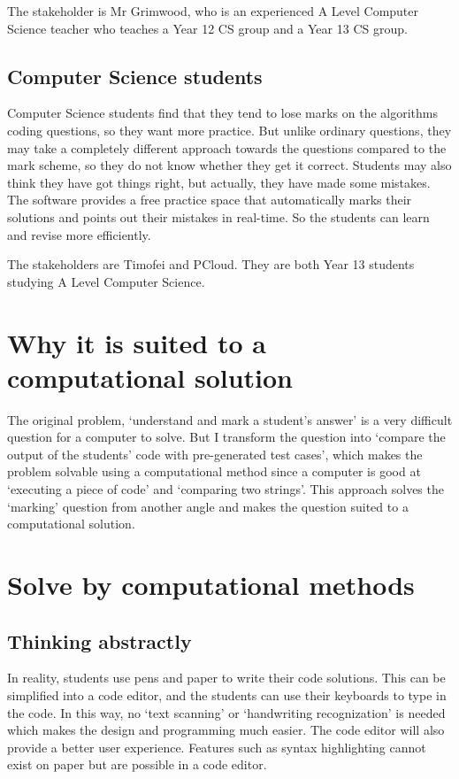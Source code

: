 \documentclass[a4paper]{report}
\begin{document}
The stakeholder is Mr Grimwood, who is an experienced A Level Computer Science teacher who teaches a Year 12 CS group and a Year 13 CS group.

\subsection{Computer Science students}

Computer Science students find that they tend to lose marks on the algorithms coding questions, so they want more practice. But unlike ordinary questions, they may take a completely different approach towards the questions compared to the mark scheme, so they do not know whether they get it correct. Students may also think they have got things right, but actually, they have made some mistakes. The software provides a free practice space that automatically marks their solutions and points out their mistakes in real-time. So the students can learn and revise more efficiently.

The stakeholders are Timofei and PCloud. They are both Year 13 students studying A Level Computer Science.

\section{Why it is suited to a computational solution}

The original problem, `understand and mark a student's answer' is a very difficult question for a computer to solve. But I transform the question into `compare the output of the students' code with pre-generated test cases', which makes the problem solvable using a computational method since a computer is good at `executing a piece of code' and `comparing two strings'. This approach solves the `marking' question from another angle and makes the question suited to a computational solution.

\section{Solve by computational methods}

\subsection{Thinking abstractly}

In reality, students use pens and paper to write their code solutions. This can be simplified into a code editor, and the students can use their keyboards to type in the code. In this way, no `text scanning' or `handwriting recognization' is needed which makes the design and programming much easier. The code editor will also provide a better user experience. Features such as syntax highlighting cannot exist on paper but are possible in a code editor.
\end{document}
